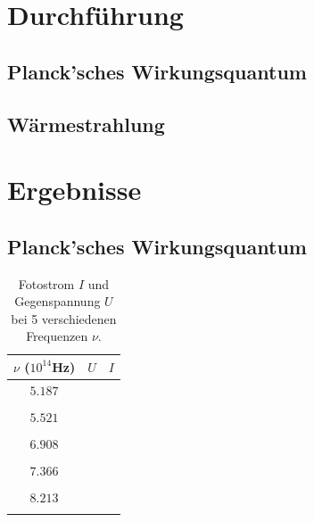 \documentclass[12pt]{article}
\begin{document}
\section{Durchführung}
\subsection{Planck'sches Wirkungsquantum}
\subsection{Wärmestrahlung}


\section{Ergebnisse}
\subsection{Planck'sches Wirkungsquantum}

\begin{table}[H]
\begin{center}
\begin{tabular}{|c||c|c|}
\hline
$\nu$ ($10^{14}$Hz) & $U$ & $I$\\
\hline
$5.187$ &  &\\
 & &\\
$5.521$ & &\\
 & &\\
$6.908$ & &\\
 & &\\
$7.366$ & &\\
 & &\\
$8.213$ & &\\
 & &\\
\hline
\end{tabular}
\caption{Fotostrom $I$ und Gegenspannung $U$ bei 5 verschiedenen Frequenzen $\nu$.}
\end{center}
\end{table}
\end{document}

